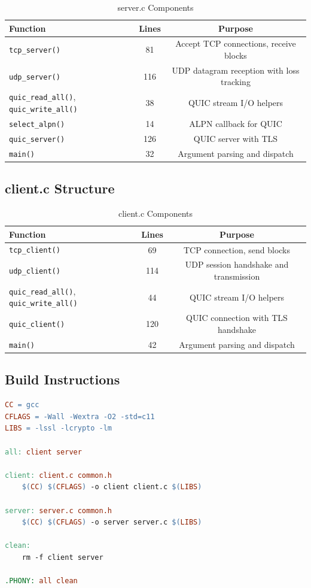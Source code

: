 \documentclass[12pt,a4paper]{article}
\begin{document}
\begin{table}[H]
\centering
\caption{server.c Components}
\begin{tabular}{|l|c|c|}
\hline
\textbf{Function} & \textbf{Lines} & \textbf{Purpose} \\
\hline
\texttt{tcp\_server()} & 81 & Accept TCP connections, receive blocks \\
\texttt{udp\_server()} & 116 & UDP datagram reception with loss tracking \\
\texttt{quic\_read\_all()}, \texttt{quic\_write\_all()} & 38 & QUIC stream I/O helpers \\
\texttt{select\_alpn()} & 14 & ALPN callback for QUIC \\
\texttt{quic\_server()} & 126 & QUIC server with TLS \\
\texttt{main()} & 32 & Argument parsing and dispatch \\
\hline
\end{tabular}
\end{table}

\subsection{client.c Structure}

\begin{table}[H]
\centering
\caption{client.c Components}
\begin{tabular}{|l|c|c|}
\hline
\textbf{Function} & \textbf{Lines} & \textbf{Purpose} \\
\hline
\texttt{tcp\_client()} & 69 & TCP connection, send blocks \\
\texttt{udp\_client()} & 114 & UDP session handshake and transmission \\
\texttt{quic\_read\_all()}, \texttt{quic\_write\_all()} & 44 & QUIC stream I/O helpers \\
\texttt{quic\_client()} & 120 & QUIC connection with TLS handshake \\
\texttt{main()} & 42 & Argument parsing and dispatch \\
\hline
\end{tabular}
\end{table}

\subsection{Build Instructions}

\begin{lstlisting}[caption=Makefile Overview,label=lst:makefile,language=make]
CC = gcc
CFLAGS = -Wall -Wextra -O2 -std=c11
LIBS = -lssl -lcrypto -lm

all: client server

client: client.c common.h
	$(CC) $(CFLAGS) -o client client.c $(LIBS)

server: server.c common.h
	$(CC) $(CFLAGS) -o server server.c $(LIBS)

clean:
	rm -f client server

.PHONY: all clean
\end{lstlisting}
\end{document}
